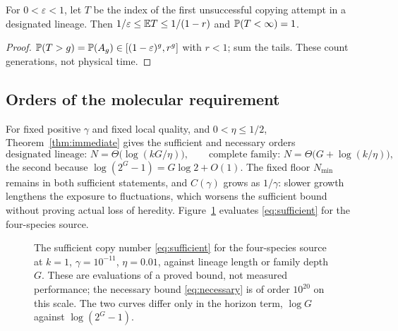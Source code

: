 \begin{proposition}\label{prop:lifetime}
For $0<\varepsilon<1$, let $T$ be the index of the first unsuccessful copying attempt in a designated lineage. Then $1/\varepsilon\le\mathbb E T\le1/(1-r)$ and $\mathbb P(T<\infty)=1$.
\end{proposition}
\begin{proof}
$\mathbb P(T>g)=\mathbb P(A_g)\in[(1-\varepsilon)^g,r^g]$ with $r<1$; sum the tails. These count generations, not physical time.
\end{proof}

\subsection{Orders of the molecular requirement}\label{sec:orders}
For fixed positive $\gamma$ and fixed local quality, and $0<\eta\le1/2$, Theorem~\ref{thm:immediate} gives the sufficient and necessary orders
\begin{equation}\label{eq:orders}
 \text{designated lineage: }N=\Theta\bigl(\log(kG/\eta)\bigr),\qquad
 \text{complete family: }N=\Theta\bigl(G+\log(k/\eta)\bigr),
\end{equation}
the second because $\log(2^G-1)=G\log2+O(1)$. The fixed floor $N_{\min}$ remains in both sufficient statements, and $C(\gamma)$ grows as $1/\gamma$: slower growth lengthens the exposure to fluctuations, which worsens the sufficient bound without proving actual loss of heredity. Figure~\ref{fig:copynumber} evaluates \eqref{eq:sufficient} for the four-species source.

\begin{figure}[t]
\centering
{}
\caption{The sufficient copy number \eqref{eq:sufficient} for the four-species source at $k=1$, $\gamma=10^{-11}$, $\eta=0.01$, against lineage length or family depth $G$. These are evaluations of a proved bound, not measured performance; the necessary bound \eqref{eq:necessary} is of order $10^{20}$ on this scale. The two curves differ only in the horizon term, $\log G$ against $\log(2^G-1)$.}\label{fig:copynumber}
\end{figure}

